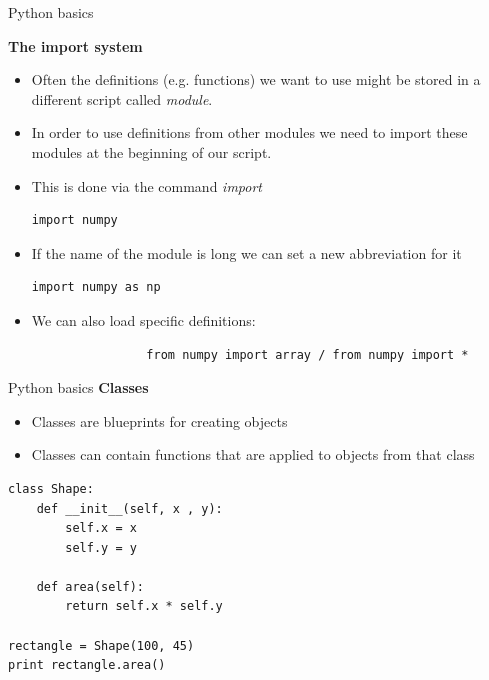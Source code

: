 \documentclass[xcolor=x11names, compress]{beamer}
\renewcommand{\(}{\begin{columns}}
\renewcommand{\)}{\end{columns}}
\newcommand{\<}[1]{\begin{column}{#1}}
\renewcommand{\>}{\end{column}}
\begin{document}
\begin{frame}[fragile]{Python basics}

\textbf{The import system}

\begin{itemize}
	\item Often the definitions (e.g. functions) we want to use might be stored in a different script called \textit{module}.
	\item In order to use definitions from other modules we need to import these modules at the beginning of our script.
	\item This is done via the command \textit{import} 
			\begin{lstlisting}[xleftmargin=.2\textwidth]
				import numpy 
			\end{lstlisting}
	\item If the name of the module is long we can set a new abbreviation for it
			\begin{lstlisting}[xleftmargin=.2\textwidth]
				import numpy as np
			\end{lstlisting}
	\item We can also load specific definitions:
			\begin{lstlisting}
				from numpy import array / from numpy import * 
			\end{lstlisting}
\end{itemize}



\end{frame}



\begin{frame}[fragile]{Python basics}
\textbf{Classes}
\begin{itemize}
\item Classes are blueprints for creating objects
\item Classes can contain functions that are applied to objects from that class
\end{itemize}

\begin{lstlisting}[xleftmargin=.2\textwidth]
class Shape:
    def __init__(self, x , y):
        self.x = x
        self.y = y

    def area(self):
        return self.x * self.y

rectangle = Shape(100, 45)
print rectangle.area()
\end{lstlisting}
\end{frame}
\end{document}
